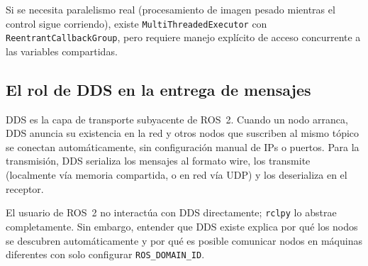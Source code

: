 Si se necesita paralelismo real (procesamiento de imagen pesado mientras el control sigue corriendo), existe \texttt{MultiThreadedExecutor} con \texttt{ReentrantCallbackGroup}, pero requiere manejo explícito de acceso concurrente a las variables compartidas.

\subsection{El rol de DDS en la entrega de mensajes}

DDS es la capa de transporte subyacente de ROS~2. Cuando un nodo arranca, DDS anuncia su existencia en la red y otros nodos que suscriben al mismo tópico se conectan automáticamente, sin configuración manual de IPs o puertos. Para la transmisión, DDS serializa los mensajes al formato wire, los transmite (localmente vía memoria compartida, o en red vía UDP) y los deserializa en el receptor.

El usuario de ROS~2 no interactúa con DDS directamente; \texttt{rclpy} lo abstrae completamente. Sin embargo, entender que DDS existe explica por qué los nodos se descubren automáticamente y por qué es posible comunicar nodos en máquinas diferentes con solo configurar \texttt{ROS\_DOMAIN\_ID}.
